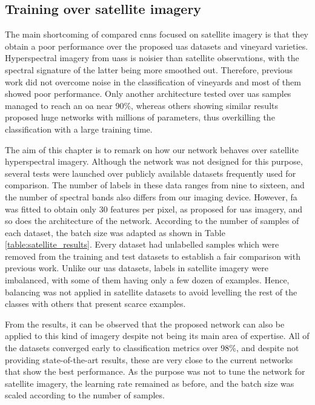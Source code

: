 \subsection{Training over satellite imagery}

The main shortcoming of compared \acrshort{cnn}s focused on satellite imagery is that they obtain a poor performance over the proposed \acrshort{uas} datasets and vineyard varieties. Hyperspectral imagery from \acrshort{uas}s is noisier than satellite observations, with the spectral signature of the latter being more smoothed out. Therefore, previous work did not overcome noise in the classification of vineyards and most of them showed poor performance. Only another architecture tested over \acrshort{uas} samples managed to reach an \acrshort{oa} near 90\%, whereas others showing similar results proposed huge networks with millions of parameters, thus overkilling the classification with a large training time. 

The aim of this chapter is to remark on how our network behaves over satellite hyperspectral imagery. Although the network was not designed for this purpose, several tests were launched over publicly available datasets frequently used for comparison. The number of labels in these data ranges from nine to sixteen, and the number of spectral bands also differs from our imaging device. However, \acrshort{fa} was fitted to obtain only 30 features per pixel, as proposed for \acrshort{uas} imagery, and so does the architecture of the network. According to the number of samples of each dataset, the batch size was adapted as shown in Table \ref{table:satellite_results}. Every dataset had unlabelled samples which were removed from the training and test datasets to establish a fair comparison with previous work. Unlike our \acrshort{uas} datasets, labels in satellite imagery were imbalanced, with some of them having only a few dozen of examples. Hence, balancing was not applied in satellite datasets to avoid levelling the rest of the classes with others that present scarce examples. 

From the results, it can be observed that the proposed network can also be applied to this kind of imagery despite not being its main area of expertise. All of the datasets converged early to classification metrics over 98\%, and despite not providing state-of-the-art results, these are very close to the current networks that show the best performance. As the purpose was not to tune the network for satellite imagery, the learning rate remained as before, and the batch size was scaled according to the number of samples.

